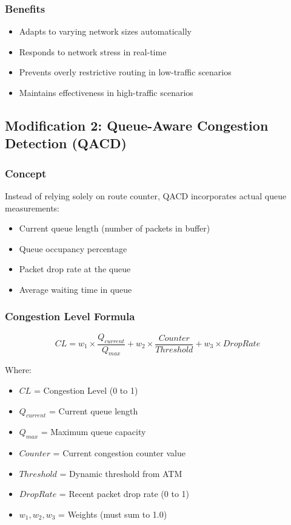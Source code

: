 \documentclass[12pt,a4paper]{article}
\begin{document}
\subsubsection{Benefits}
\begin{itemize}
    \item Adapts to varying network sizes automatically
    \item Responds to network stress in real-time
    \item Prevents overly restrictive routing in low-traffic scenarios
    \item Maintains effectiveness in high-traffic scenarios
\end{itemize}

\subsection{Modification 2: Queue-Aware Congestion Detection (QACD)}

\subsubsection{Concept}
Instead of relying solely on route counter, QACD incorporates actual queue measurements:
\begin{itemize}
    \item Current queue length (number of packets in buffer)
    \item Queue occupancy percentage
    \item Packet drop rate at the queue
    \item Average waiting time in queue
\end{itemize}

\subsubsection{Congestion Level Formula}

\begin{equation}
CL = w_1 \times \frac{Q_{current}}{Q_{max}} + w_2 \times \frac{Counter}{Threshold} + w_3 \times DropRate
\end{equation}

Where:
\begin{itemize}
    \item $CL$ = Congestion Level (0 to 1)
    \item $Q_{current}$ = Current queue length
    \item $Q_{max}$ = Maximum queue capacity
    \item $Counter$ = Current congestion counter value
    \item $Threshold$ = Dynamic threshold from ATM
    \item $DropRate$ = Recent packet drop rate (0 to 1)
    \item $w_1, w_2, w_3$ = Weights (must sum to 1.0)
\end{itemize}
\end{document}
